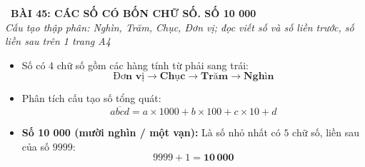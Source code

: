 \documentclass[11pt,a4paper]{article}
\begin{document}
\begin{tcolorbox}[
  enhanced,
  colback=white,
  colframe=primary,
  arc=3mm,
  boxrule=1.2pt,
  left=4mm, right=4mm, top=2.5mm, bottom=2.5mm,
  drop shadow=black!10!white
]
  \centering
  {\Large\bfseries\color{primary}\faBookmark\ BÀI 45: CÁC SỐ CÓ BỐN CHỮ SỐ. SỐ 10 000}\\[1.5mm]
  {\small\itshape\color{black!75}Cấu tạo thập phân: Nghìn, Trăm, Chục, Đơn vị; đọc viết số và số liền trước, số liền sau trên 1 trang A4}
\end{tcolorbox}

\vspace{-2mm}


\noindent
\begin{minipage}[t]{0.49\textwidth}\vspace{0pt}
\begin{tcolorbox}[
  enhanced,
  colback=blue!4!white,
  colframe=blue!75!black,
  arc=2mm, boxrule=0.8pt,
  left=2mm, right=2mm, top=1.8mm, bottom=1.8mm,
  title={\footnotesize\bfseries\color{white}\faKey\ 1. Cấu tạo số có 4 chữ số}
]
{\footnotesize
\begin{itemize}\setlength{\itemsep}{1.5pt}\setlength{\leftskip}{-2.5mm}
  \item Số có 4 chữ số gồm các hàng tính từ phải sang trái:
  $$\mathbf{\text{Đơn vị}} \to \mathbf{\text{Chục}} \to \mathbf{\text{Trăm}} \to \mathbf{\text{Nghìn}}$$
  \item Phân tích cấu tạo số tổng quát:
  $$\overline{abcd} = a \times 1000 + b \times 100 + c \times 10 + d$$
  \item \textbf{Số 10 000 (mười nghìn / một vạn):}
  Là số nhỏ nhất có $5$ chữ số, liền sau của số $9999$:
  $$9999 + 1 = \mathbf{10\,000}$$
\end{itemize}
}
\end{tcolorbox}
\end{minipage}
\hfill
\end{document}
